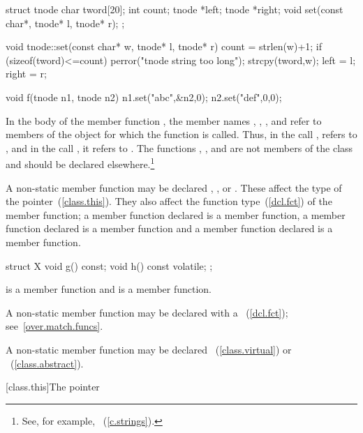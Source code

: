 \begin{codeblock}
struct tnode {
  char tword[20];
  int count;
  tnode *left;
  tnode *right;
  void set(const char*, tnode* l, tnode* r);
};

void tnode::set(const char* w, tnode* l, tnode* r) {
  count = strlen(w)+1;
  if (sizeof(tword)<=count)
      perror("tnode string too long");
  strcpy(tword,w);
  left = l;
  right = r;
}

void f(tnode n1, tnode n2) {
  n1.set("abc",&n2,0);
  n2.set("def",0,0);
}
\end{codeblock}

In the body of the member function , the member names
, , , and  refer to
members of the object for which the function is called. Thus, in the
call ,  refers to
, and in the call , it refers
to . The functions , , and
 are not members of the class  and should be
declared elsewhere.\footnote{See, for example, ~(\ref{c.strings}).}
\exitexample

\pnum
A non-static member function may be declared ,
, or  . These
 affect the type of the 
pointer~(\ref{class.this}). They also affect the function
type~(\ref{dcl.fct}) of the member function; a member function declared
 is a  member function, a member function
declared  is a  member function and a
member function declared   is a
 member function.
\enterexample

\begin{codeblock}
struct X {
  void g() const;
  void h() const volatile;
};
\end{codeblock}

 is a  member function and  is a
  member function.
\exitexample

\pnum
A non-static member function may be declared with a ~(\ref{dcl.fct}); see~\ref{over.match.funcs}.

\pnum
A non-static member function may be declared
~(\ref{class.virtual}) or ~(\ref{class.abstract}).

[class.this]{The  pointer}%

